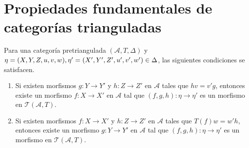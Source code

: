 \documentclass[tesis]{subfiles}
\begin{document}
\section{Propiedades fundamentales de categorías trianguladas} \label{Sec: Propiedades fundamentales de categorías trianguladas}

\begin{Lema}\label{Mendoza_CT-1.1} %
    Para una categoría pretriangulada $(\mathscr{A},T,\Delta)$ y $\eta = (X,Y,Z,u,v,w), \eta' = (X',Y',Z',u',v',\break w')\in\Delta$, las siguientes condiciones se satisfacen.
\end{Lema}

\begin{enumerate}[label=(\alph*)]

    \item Si existen morfismos $g:Y\to Y'$ y $h:Z\to Z'$ en $\mathscr{A}$ tales que $hv=v'g$, entonces existe un morfismo $f:X\to X'$ en $\mathscr{A}$ tal que $(f,g,h):\eta\to \eta'$ es un morfismo en $\mathscr{T}(\mathscr{A},T)$.

    \item Si existen morfismos $f:X\to X'$ y $h:Z\to Z'$ en $\mathscr{A}$ tales que $T(f)w=w'h$, entonces existe un morfismo $g:Y\to Y'$ en $\mathscr{A}$ tal que $(f,g,h):\eta\to \eta'$ es un morfismo en $\mathscr{T}(\mathscr{A},T)$.
\end{enumerate}
\end{document}
